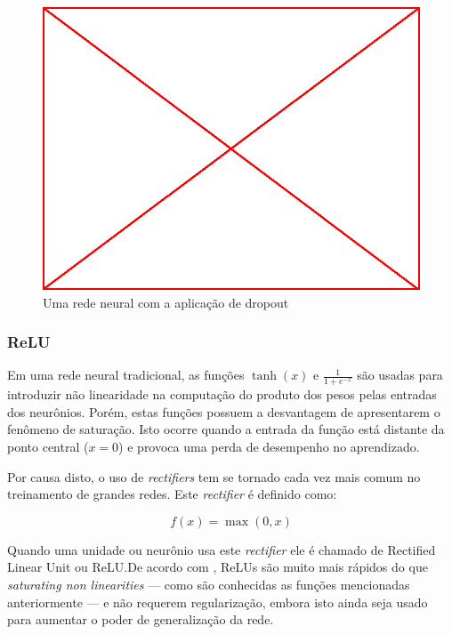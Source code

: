 \begin{figure}
  \caption{Uma rede neural com a aplicação de dropout}
  \begin{center}
    \includegraphics[scale=0.5]{placeholder}
  \end{center}
\end{figure}

\subsubsection{ReLU}

Em uma rede neural tradicional, as funções $\tanh(x)$ e $\frac{1}{1+e^{-x}}$
são usadas para introduzir não linearidade na computação do produto dos pesos
pelas entradas dos neurônios. Porém, estas funções possuem a desvantagem de
apresentarem o fenômeno de saturação. Isto ocorre quando a entrada da função
está distante da ponto central ($x=0$) e provoca uma perda de desempenho no
aprendizado.\cite{krizhevsky2012imagenet}

Por causa disto, o uso de \emph{rectifiers} tem se tornado cada vez mais comum
no treinamento de grandes redes. Este \emph{rectifier} é definido como:

$$ f(x) = \max(0,x) $$

Quando uma unidade ou neurônio usa este \emph{rectifier} ele é chamado de
Rectified Linear Unit ou ReLU.\@ De acordo com \citep{krizhevsky2012imagenet},
ReLUs são muito mais rápidos do que \emph{saturating non linearities} --- como
são conhecidas as funções mencionadas anteriormente --- e não requerem
regularização, embora isto ainda seja usado para aumentar o poder de
generalização da rede.

